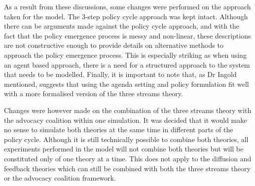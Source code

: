 As a result from these discussions, some changes were performed on the approach taken for the model. The 3-step policy cycle approach was kept intact. Although there can be arguments made against the policy cycle approach, and with the fact that the policy emergence process is messy and non-linear, these descriptions are not constructive enough to provide details on alternative methods to approach the policy emergence process. This is especially striking as when using an agent based approach, there is a need for a structured approach to the system that needs to be modelled. Finally, it is important to note that, as Dr Ingold mentioned, \cite{herweg2015straightening} suggests that using the agenda setting and policy formulation fit well with a more formalised version of the three streams theory.
 
Changes were however made on the combination of the three streams theory with the advocacy coalition within one simulation. It was decided that it would make no sense to simulate both theories at the same time in different parts of the policy cycle. Although it is still technically possible to combine both theories, all experiments performed in the model will not combine both theories but will be constituted only of one theory at a time. This does not apply to the diffusion and feedback theories which can still be combined with both the three streams theory or the advocacy coalition framework.